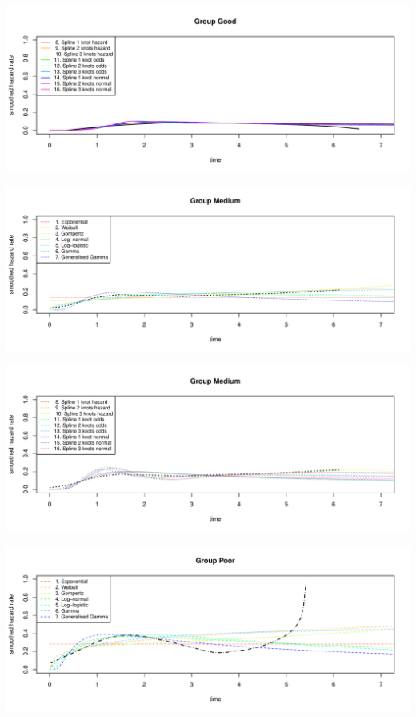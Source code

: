 \documentclass[]{article}
\begin{document}
\begin{flushleft}\includegraphics[height=0.29\textheight]{Images/plot_haz_pred-2} \end{flushleft}

\begin{flushleft}\includegraphics[height=0.29\textheight]{Images/plot_haz_pred-3} \end{flushleft}

\begin{flushleft}\includegraphics[height=0.29\textheight]{Images/plot_haz_pred-4} \end{flushleft}

\begin{flushleft}\includegraphics[height=0.29\textheight]{Images/plot_haz_pred-5} \end{flushleft}
\end{document}
